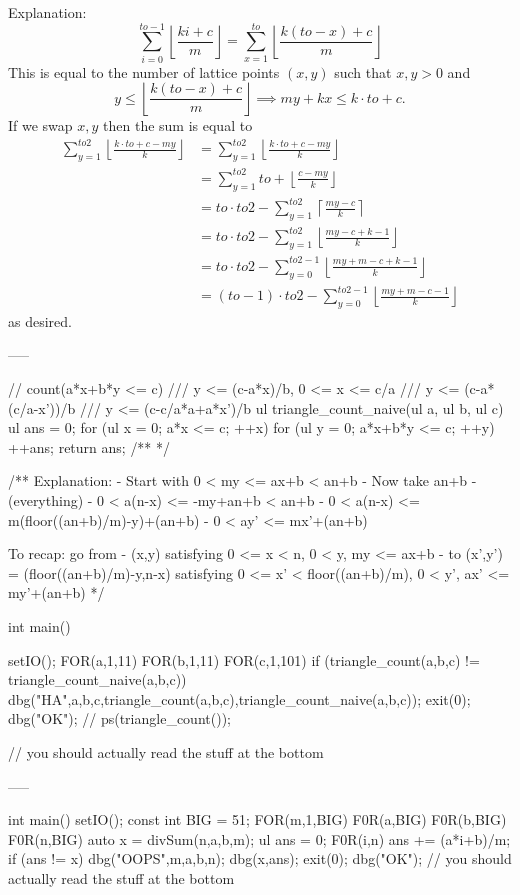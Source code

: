 Explanation:
$$\sum_{i=0}^{to-1}\left\lfloor \frac{ki+c}{m}\right\rfloor=\sum_{x=1}^{to}\left\lfloor \frac{k(to-x)+c}{m}\right\rfloor$$
This is equal to the number of lattice points $(x,y)$ such that $x,y>0$ and
$$y\le \left\lfloor \frac{k(to-x)+c}{m}\right\rfloor\implies my+kx\le k\cdot to+c.$$
If we swap $x,y$ then the sum is equal to
\begin{align*}
\sum_{y=1}^{to2}\left\lfloor \frac{k\cdot to+c-my}{k}\right\rfloor&=\sum_{y=1}^{to2}\left\lfloor \frac{k\cdot to+c-my}{k}\right\rfloor\\
&=\sum_{y=1}^{to2}to+\left\lfloor \frac{c-my}{k}\right\rfloor\\
&=to\cdot to2-\sum_{y=1}^{to2}\left\lceil \frac{my-c}{k}\right\rceil\\
&=to\cdot to2-\sum_{y=1}^{to2}\left\lfloor \frac{my-c+k-1}{k}\right\rfloor\\
&=to\cdot to2-\sum_{y=0}^{to2-1}\left\lfloor \frac{my+m-c+k-1}{k}\right\rfloor\\
&=(to-1)\cdot to2-\sum_{y=0}^{to2-1}\left\lfloor \frac{my+m-c-1}{k}\right\rfloor
\end{align*}
as desired.

-----


// count(a*x+b*y <= c)
/// y <= (c-a*x)/b, 0 <= x <= c/a
/// y <= (c-a*(c/a-x'))/b
/// y <= (c-c/a*a+a*x')/b
ul triangle_count_naive(ul a, ul b, ul c) {
    ul ans = 0;
    for (ul x = 0; a*x <= c; ++x) 
        for (ul y = 0; a*x+b*y <= c; ++y) 
            ++ans;
    return ans;
}
/**
*/

/**
Explanation:
- Start with 0 < my <= ax+b < an+b
- Now take an+b - (everything)
- 0 < a(n-x) <= -my+an+b < an+b
- 0 < a(n-x) <= m(floor((an+b)/m)-y)+(an+b)%
- 0 < ay' <= mx'+(an+b)%

To recap: go from 
 - (x,y) satisfying 0 <= x < n, 0 < y, my <= ax+b
 - to (x',y') = (floor((an+b)/m)-y,n-x) satisfying 
   0 <= x' < floor((an+b)/m), 0 < y', ax' <= my'+(an+b)%
*/

int main() {
    setIO();
    FOR(a,1,11) FOR(b,1,11) FOR(c,1,101) {
        if (triangle_count(a,b,c) != triangle_count_naive(a,b,c)) {
            dbg("HA",a,b,c,triangle_count(a,b,c),triangle_count_naive(a,b,c));
            exit(0);
        }
    }
    dbg("OK");
    // ps(triangle_count());
    
    // you should actually read the stuff at the bottom
}

-----

int main() {
    setIO();
    const int BIG = 51;
    FOR(m,1,BIG) F0R(a,BIG) F0R(b,BIG) F0R(n,BIG) {
        auto x = divSum(n,a,b,m);
        ul ans = 0;
        F0R(i,n) ans += (a*i+b)/m;
        if (ans != x) {
            dbg("OOPS",m,a,b,n);
            dbg(x,ans);
            exit(0);
        }
    }
    dbg("OK");
    // you should actually read the stuff at the bottom
}
